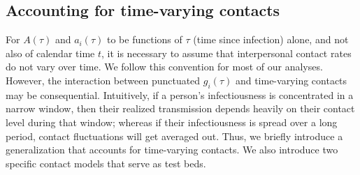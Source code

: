 \subsection{Accounting for time-varying contacts}
For $A(\tau)$ and $a_i(\tau)$ to be functions of $\tau$ (time since infection) alone, and not also of calendar time $t$, it is necessary to assume that interpersonal contact rates do not vary over time. We follow this convention for most of our analyses. However, the interaction between punctuated $g_i(\tau)$ and time-varying contacts may be consequential. Intuitively, if a person's infectiousness is concentrated in a narrow window, then their realized transmission depends heavily on their contact level during that window; whereas if their infectiousness is spread over a long period, contact fluctuations will get averaged out. Thus, we briefly introduce a generalization that accounts for time-varying contacts. We also introduce two specific contact models that serve as test beds. 

